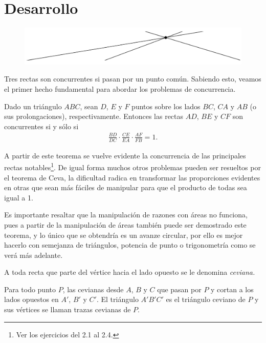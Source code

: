 \section{Desarrollo}

\begin{figure}[htb]
    \centering
    \includegraphics[width=14cm]{images/concurrence-1}
\end{figure}

Tres rectas son concurrentes si pasan por un punto común.
Sabiendo esto, veamos el primer hecho fundamental para abordar los problemas de concurrencia.

\begin{section-theorem.tcb}
    Dado un triángulo $ABC$, sean $D$, $E$ y $F$ puntos sobre los lados $BC$, $CA$ y $AB$ (o sus prolongaciones), respectivamente.
    Entonces las rectas $AD$, $BE$ y $CF$ son concurrentes si y sólo si
    \begin{gather*}
        \frac{BD}{DC} \cdot \frac{CE}{EA} \cdot \frac{AF}{FB} = 1.
    \end{gather*}
\end{section-theorem.tcb}

A partir de este teorema se vuelve evidente la concurrencia de las principales rectas notables\footnote{Ver los ejercicios del 2.1 al 2.4.}.
De igual forma muchos otros problemas pueden ser resueltos por el teorema de Ceva, la dificultad radica en transformar las proporciones evidentes en otras que sean más fáciles de manipular para que el producto de todas sea igual a 1.

Es importante resaltar que la manipulación de razones con áreas no funciona, pues a partir de la manipulación de áreas también puede ser demostrado este teorema, y lo único que se obtendría es un avanze circular, por ello es mejor hacerlo con semejanza de triángulos, potencia de punto o trigonometría como se verá más adelante.

\begin{section-definition.tcb}
    A toda recta que parte del vértice hacia el lado opuesto se le denomina \textit{ceviana.}
\end{section-definition.tcb}

\begin{section-definition.tcb}
    Para todo punto $P$, las cevianas desde $A$, $B$ y $C$ que pasan por $P$ y cortan a los lados opuestos en $A'$, $B'$ y $C'$.
    El triángulo $A'B'C'$ es el triángulo ceviano de $P$ y sus vértices se llaman trazas cevianas de $P$.
\end{section-definition.tcb}

